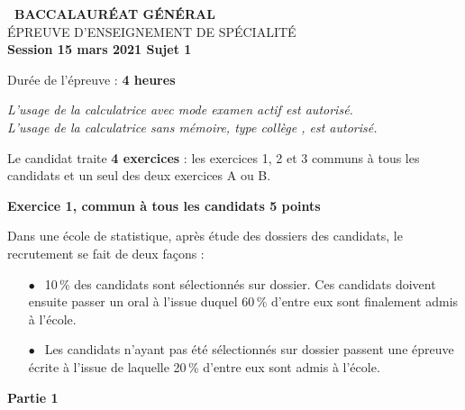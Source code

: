 \documentclass[10pt,a4paper,french]{article}
\begin{document}
\setlength\parindent{0mm}

\pagestyle{fancy}
\thispagestyle{empty}
\begin{center}{\textbf{\Large\decofourleft~BACCALAURÉAT GÉNÉRAL}~\decofourright\\[6pt]
{\large ÉPREUVE D'ENSEIGNEMENT DE SPÉCIALITÉ}\\[6pt] 
\textbf{Session 15 mars 2021 Sujet 1}}

\vspace{1cm}

Durée de l’épreuve : \textbf{4 heures}

\vspace{1cm}

\emph{L’usage de la calculatrice avec mode examen actif est autorisé.\\
L’usage de la calculatrice sans mémoire, \og type collège \fg, est autorisé.}

\end{center}

\vspace{0,25cm}

Le candidat traite \textbf{4 exercices} : les exercices 1, 2 et 3 communs à tous les candidats et un seul des deux exercices A ou B.

\bigskip

\textbf{Exercice 1, commun à tous les candidats \hfill 5 points}

\medskip

Dans une école de statistique, après étude des dossiers des candidats, le recrutement se fait de deux façons :

\setlength\parindent{1cm}
\begin{itemize}
\item[$\bullet~~$] 10\,\% des candidats sont sélectionnés sur dossier. Ces candidats doivent ensuite passer un oral à l'issue duquel 60\,\% d'entre eux sont finalement admis à l'école.
\item[$\bullet~~$] Les candidats n'ayant pas été sélectionnés sur dossier passent une épreuve écrite à l'issue de laquelle 20\,\% d'entre eux sont admis à l'école.
\end{itemize}
\setlength\parindent{0cm}

\bigskip

\textbf{Partie 1}

\medskip
\end{document}
